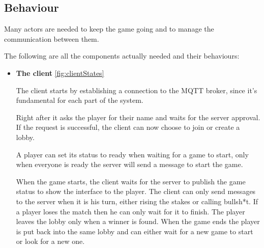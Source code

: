 \documentclass{scrartcl}
\begin{document}
\subsection{Behaviour}\label{behaviour}

Many actors are needed to keep the game going and to manage the communication between them.

The following are all the components actually needed and their behaviours:
\begin{itemize}
      \item
            \textbf{The client} \cref{fig:clientStates} \par
            The client starts by establishing a connection to the MQTT broker, since it's fundamental
            for each part of the system. 

            Right after it asks the player for their name and waits for the server approval.
            If the request is successful, the client can now choose to join or create a lobby. 

            A player can set its status to ready when waiting for a game to start, only when everyone is ready
            the server will send a message to start the game. 

            When the game starts, the client waits for the server to publish the game status to
            show the interface to the player.
            The client can only send messages to the server when it is his turn, either rising the stakes
            or calling bullsh*t. If a player loses the match then he can only wait for it to finish.
            The player leaves the lobby only when a winner is found. When the game ends the
            player is put back into the same lobby and can either wait for a new game to start or look for a new one.


\end{itemize}
\end{document}
